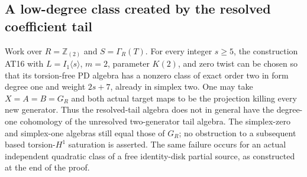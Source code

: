\subsection{A low-degree class created by the resolved coefficient tail}

\begin{proposition}
\label{AL11}
Work over $R=\mathbb Z_{(2)}$ and $S=\Gamma_R(T)$.
For every integer $s\geq5$, the construction AT16
with $L=I_1\langle s\rangle$, $m=2$, parameter
$K(2)$, and zero twist can be chosen so that its
torsion-free PD algebra has a nonzero class of
exact order two in form degree one and weight
$2s+7$, already in simplex two.
One may take $X=A=B=G_R$ and both actual target
maps to be the projection killing every new generator.
Thus the resolved-tail algebra does not in general
have the degree-one cohomology of the unresolved
two-generator tail algebra.
The simplex-zero and simplex-one algebras still
equal those of $G_R$; no obstruction to a subsequent
based torsion-$H^1$ saturation is asserted.
The same failure occurs for an actual independent
quadratic class of a free identity-disk partial source,
as constructed at the end of the proof.
\end{proposition}

